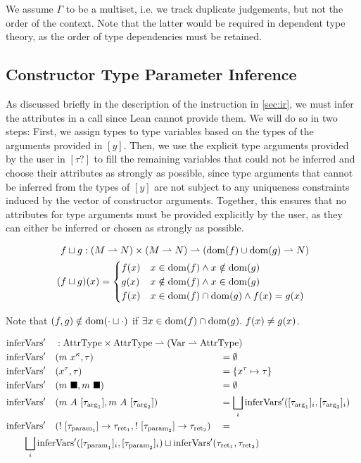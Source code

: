 We assume $\Gamma$ to be a multiset, i.e. we track duplicate judgements, but not the order of the context. Note that the latter would be required in dependent type theory, as the order of type dependencies must be retained.

\subsection{Constructor Type Parameter Inference}

As discussed briefly in the description of the  instruction in \cref{sec:ir}, we must infer the attributes in a  call since Lean cannot provide them. We will do so in two steps: First, we assign types to type variables based on the types of the arguments provided in $[y]$. Then, we use the explicit type arguments provided by the user in $[\tau?]$ to fill the remaining variables that could not be inferred and choose their attributes as strongly as possible, since type arguments that cannot be inferred from the types of $[y]$ are not subject to any uniqueness constraints induced by the vector of constructor arguments. Together, this ensures that no attributes for type arguments must be provided explicitly by the user, as they can either be inferred or chosen as strongly as possible.

\begin{alignat*}{3}
	f &\sqcup g : (M \rightharpoonup N) \times (M \rightharpoonup N) \rightharpoonup (\mathrm{dom}(f) \cup \mathrm{dom}(g) \rightharpoonup N) \\
	(f &\sqcup g)(x) = \begin{cases}
		f(x) & x \in \mathrm{dom}(f) \land x \notin \mathrm{dom}(g) \\
		g(x) & x \notin \mathrm{dom}(f) \land x \in \mathrm{dom}(g) \\
		f(x) & x \in \mathrm{dom}(f) \cap \mathrm{dom}(g) \land f(x) = g(x)
	\end{cases}
\end{alignat*}

Note that $(f, g) \notin \mathrm{dom}(\cdot \sqcup \cdot)$ if $\exists x \in \mathrm{dom}(f) \cap \mathrm{dom}(g).\ f(x) \neq g(x)$.

\newcommand{\inferVarsDash}{\mathrm{inferVars'}}

\begin{alignat*}{3}
	&\inferVarsDash &&: \mathrlap{\AttrType \times \AttrType \rightharpoonup (\Var \rightharpoonup \AttrType)} \\
	&\inferVarsDash&&(m\ x^\kappa, \tau) &&= \emptyset \\
	&\inferVarsDash&&(x^\tau, \tau) &&= \{ x^\tau \mapsto \tau \} \\
	&\inferVarsDash&&(m\ \blacksquare, m\ \blacksquare) &&= \emptyset \\
	&\inferVarsDash&&(m\ A\ [\tau_{\arrg_1}], m\ A\ [\tau_{\arrg_2}]) &&= \bigsqcup_i \inferVarsDash([\tau_{\arrg_1}]_i, [\tau_{\arrg_2}]_i) \\
	&\inferVarsDash&&(!\ [\tau_{\param_1}] \to \tau_{\ret_1}, !\ [\tau_{\param_2}] \to \tau_{\ret_2}) &&= \\
	&\rebreak{\bigsqcup_i \inferVarsDash([\tau_{\param_1}]_i, [\tau_{\param_2}]_i) \sqcup \inferVarsDash(\tau_{\ret_1}, \tau_{\ret_2})}
\end{alignat*}

